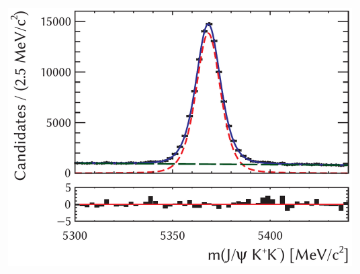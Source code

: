 \begin{figure}[p]
  \centering
  \begin{subfigure}{0.65\textwidth}
    \includegraphics[width=\textwidth]{graphics/analysis/JpsiKKMass_I2_bkgSub_lin_resid}
    \caption{}
    \label{fig:JpsiKKMass_I2_bkgSub_lin}
  \end{subfigure}


\end{figure}
